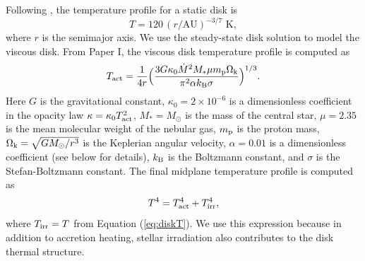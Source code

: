 \documentclass[apj]{emulateapj}
\begin{document}
Following \citet{chiang10}, the temperature profile for a static disk is
\begin{equation}
\label{eq:diskT}
T = 120\, (r/\text{AU})^{-3/7} \,\,\text{K},
\end{equation}
where $r$ is the semimajor axis.%
We use the \citet{shakura73}  steady-state disk solution to model the viscous disk. From Paper I, the viscous disk temperature profile is computed as %
\begin{equation}
\label{eq:Tdact}
T_{\rm act}=\frac{1}{4 r} \Big(\frac{3 G \kappa_0\dot{M}^2 M_* \mu m_{\rm p} \Omega_{\rm k}}{\pi^2 \alpha k_{\rm B} \sigma}\Big)^{1/3}.
\end{equation}
Here $G$ is the gravitational constant, $\kappa_0=2 \times 10^{-6}$ is a dimensionless coefficient in the opacity law $\kappa=\kappa_0 T_{\rm act}^2$, $M_*=M_{\odot}$ is the mass of the central star, $\mu=2.35$ is the mean molecular weight of the nebular gas, $m_{\rm p}$ is the proton mass, $\Omega_{\rm k}=\sqrt{G M_{\odot}/r^3}$ is the Keplerian angular velocity, $\alpha=0.01$ is a dimensionless coefficient (see below for details), $k_{\rm B}$ is the Boltzmann constant, and $\sigma$ is the Stefan-Boltzmann constant. The final midplane temperature profile is computed as 
\begin{equation}
\label{eq:activeT}
T^4 = T_{\rm act}^4 + T_{\rm irr}^4,
\end{equation}
where $T_{\rm irr}=T$ from Equation (\ref{eq:diskT}). We use this expression because in addition to accretion heating, stellar irradiation also contributes to the disk thermal structure. 
\end{document}
